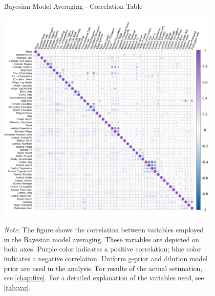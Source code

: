 \begin{figure}[!htbp]
\begin{center}
\caption{Bayesian Model Averaging - Correlation Table}
\label{fig:bma_corr}
\includegraphics[width=1\textwidth]{Figures/BMA/bma_UIP_dilut_corrplot.png}
\end{center}\vspace{-0.5cm}
\captionsetup{width=0.9\textwidth, font = scriptsize}
\caption*{\emph{Note:} The figure shows the correlation between variables employed in the Bayesian model averaging. These variables are depicted on both axes. Purple color indicates a positive correlation; blue color indicates a negative correlation. Uniform g-prior and dilution model prior are used in the analysis. For results of the actual estimation, see \autoref{chap:five}. For a detailed explanation of the variables used, see \autoref{tab:var}.
}
\end{figure}



